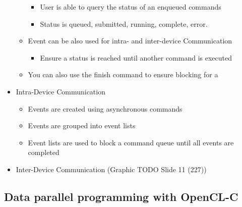 \documentclass[paper=a4, fontsize=11pt]{scrartcl} %
\numberwithin{equation}{section} %
\numberwithin{figure}{section} %
\numberwithin{table}{section} %
\begin{document}
\begin{itemize}
\begin{itemize}
\begin{itemize}
      \item User is able to query the status of an enqueued commands
      \item Status is queued, submitted, running, complete, error.
    \end{itemize}
    \item Event can be also used for intra- and inter-device Communication
    \begin{itemize}
      \item Ensure a status is reached until another command is executed
    \end{itemize}
    \item You can also use the finish command to ensure blocking for a
  \end{itemize}
  \item Intra-Device Communication
  \begin{itemize}
    \item Events are created using asynchronous commands
    \item Events are grouped into event lists
    \item Event lists are used to block a command queue until all events are completed
  \end{itemize}
  \item Inter-Device Communication (Graphic TODO Slide 11 (227))
\end{itemize}

\subsection{Data parallel programming with OpenCL-C}
\end{document}
